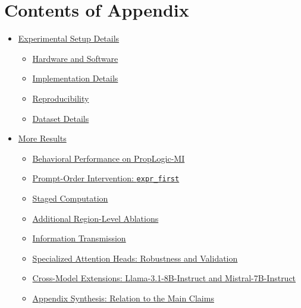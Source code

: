 \documentclass[11pt]{article}
\begin{document}

\appendix
\section*{Contents of Appendix}
\begin{itemize}
    \item[\ref{sec:appendix_setup}] \hyperref[sec:appendix_setup]{Experimental Setup Details}
    \begin{itemize}
        \item[\ref{sec:appendix_hardware}] \hyperref[sec:appendix_hardware]{Hardware and Software}
        \item[\ref{sec:appendix_implementation}] \hyperref[sec:appendix_implementation]{Implementation Details}
        \item[\ref{sec:appendix_reproducibility}] \hyperref[sec:appendix_reproducibility]{Reproducibility}
        \item[\ref{sec:appendix_dataset}] \hyperref[sec:appendix_dataset]{Dataset Details}
    \end{itemize}
    \item[\ref{sec:appendix_results}] \hyperref[sec:appendix_results]{More Results}
	    \begin{itemize}
	        \item[\ref{sec:appendix_performance}] \hyperref[sec:appendix_performance]{Behavioral Performance on PropLogic-MI}
	        \item[\ref{sec:appendix_prompt_order}] \hyperref[sec:appendix_prompt_order]{Prompt-Order Intervention: \texttt{expr\_first}}
	        \item[\ref{sec:appendix_stage}] \hyperref[sec:appendix_stage]{Staged Computation}
	        \item[\ref{sec:appendix_region_variants}] \hyperref[sec:appendix_region_variants]{Additional Region-Level Ablations}
	        \item[\ref{sec:appendix_info_converge}] \hyperref[sec:appendix_info_converge]{Information Transmission}
		        \item[\ref{appendix_heads}] \hyperref[appendix_heads]{Specialized Attention Heads: Robustness and Validation}
		        \item[\ref{sec:appendix_llama}] \hyperref[sec:appendix_llama]{Cross-Model Extensions: Llama-3.1-8B-Instruct and Mistral-7B-Instruct}
		        \item[\ref{sec:appendix_synthesis}] \hyperref[sec:appendix_synthesis]{Appendix Synthesis: Relation to the Main Claims}

\end{itemize}
\end{itemize}
\end{document}

